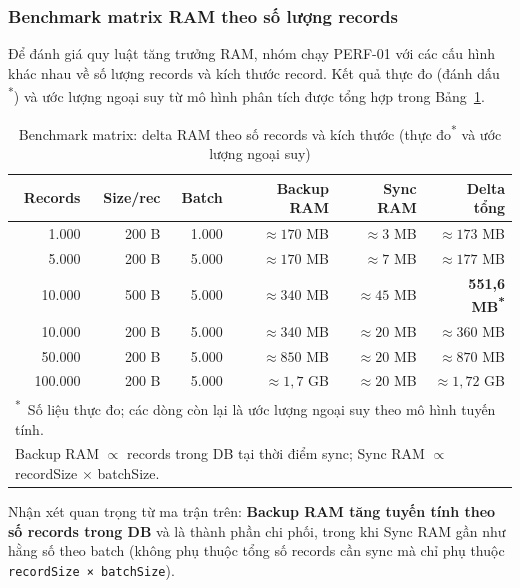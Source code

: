 \subsubsection{Benchmark matrix RAM theo số lượng records}

Để đánh giá quy luật tăng trưởng RAM, nhóm chạy PERF-01 với các
cấu hình khác nhau về số lượng records và kích thước record. Kết quả
thực đo (đánh dấu \textsuperscript{*}) và ước lượng ngoại suy từ
mô hình phân tích được tổng hợp trong Bảng~\ref{tab:ram-matrix}.

\begin{table}[H]
\centering
\caption{Benchmark matrix: delta RAM theo số records và kích thước
(thực đo\textsuperscript{*} và ước lượng ngoại suy)}
\label{tab:ram-matrix}
\begin{tabular}{rrrrrr}
\toprule
\textbf{Records} & \textbf{Size/rec} & \textbf{Batch} &
\textbf{Backup RAM} & \textbf{Sync RAM} & \textbf{Delta tổng} \\
\midrule
1.000   & 200 B & 1.000 & $\approx 170$ MB & $\approx 3$ MB  & $\approx 173$ MB \\
5.000   & 200 B & 5.000 & $\approx 170$ MB & $\approx 7$ MB  & $\approx 177$ MB \\
10.000  & 500 B & 5.000 & $\approx 340$ MB & $\approx 45$ MB & \textbf{551,6 MB\textsuperscript{*}} \\
10.000  & 200 B & 5.000 & $\approx 340$ MB & $\approx 20$ MB & $\approx 360$ MB \\
50.000  & 200 B & 5.000 & $\approx 850$ MB & $\approx 20$ MB & $\approx 870$ MB \\
100.000 & 200 B & 5.000 & $\approx 1,7$ GB & $\approx 20$ MB & $\approx 1,72$ GB \\
\bottomrule
\multicolumn{6}{l}{\footnotesize\textsuperscript{*}~Số liệu thực đo;
  các dòng còn lại là ước lượng ngoại suy theo mô hình tuyến tính.} \\
\multicolumn{6}{l}{\footnotesize Backup RAM $\propto$ records trong DB
  tại thời điểm sync; Sync RAM $\propto$ recordSize $\times$ batchSize.}
\end{tabular}
\end{table}

Nhận xét quan trọng từ ma trận trên: \textbf{Backup RAM tăng tuyến
tính theo số records trong DB} và là thành phần chi phối, trong khi
Sync RAM gần như hằng số theo batch (không phụ thuộc tổng số records
cần sync mà chỉ phụ thuộc \texttt{recordSize × batchSize}).

